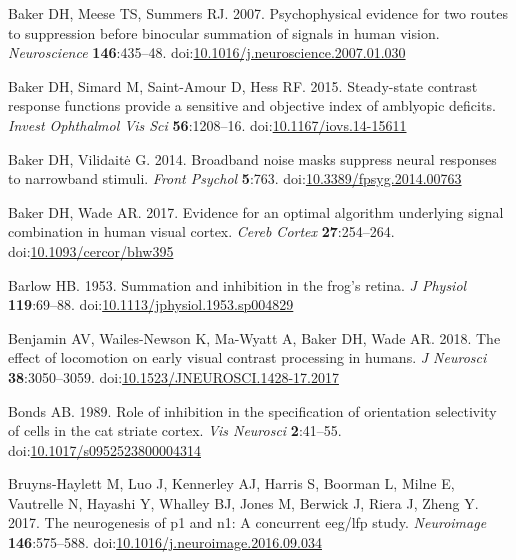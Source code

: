 \documentclass[]{article}
\begin{document}
\leavevmode\hypertarget{ref-Baker2007}{}%
Baker DH, Meese TS, Summers RJ. 2007. Psychophysical evidence for two routes to suppression before binocular summation of signals in human vision. \emph{Neuroscience} \textbf{146}:435--48. doi:\href{https://doi.org/10.1016/j.neuroscience.2007.01.030}{10.1016/j.neuroscience.2007.01.030}

\leavevmode\hypertarget{ref-Baker2015}{}%
Baker DH, Simard M, Saint-Amour D, Hess RF. 2015. Steady-state contrast response functions provide a sensitive and objective index of amblyopic deficits. \emph{Invest Ophthalmol Vis Sci} \textbf{56}:1208--16. doi:\href{https://doi.org/10.1167/iovs.14-15611}{10.1167/iovs.14-15611}

\leavevmode\hypertarget{ref-Baker2014}{}%
Baker DH, Vilidaitė G. 2014. Broadband noise masks suppress neural responses to narrowband stimuli. \emph{Front Psychol} \textbf{5}:763. doi:\href{https://doi.org/10.3389/fpsyg.2014.00763}{10.3389/fpsyg.2014.00763}

\leavevmode\hypertarget{ref-Baker2017}{}%
Baker DH, Wade AR. 2017. Evidence for an optimal algorithm underlying signal combination in human visual cortex. \emph{Cereb Cortex} \textbf{27}:254--264. doi:\href{https://doi.org/10.1093/cercor/bhw395}{10.1093/cercor/bhw395}

\leavevmode\hypertarget{ref-Barlow1953}{}%
Barlow HB. 1953. Summation and inhibition in the frog's retina. \emph{J Physiol} \textbf{119}:69--88. doi:\href{https://doi.org/10.1113/jphysiol.1953.sp004829}{10.1113/jphysiol.1953.sp004829}

\leavevmode\hypertarget{ref-Benjamin2018}{}%
Benjamin AV, Wailes-Newson K, Ma-Wyatt A, Baker DH, Wade AR. 2018. The effect of locomotion on early visual contrast processing in humans. \emph{J Neurosci} \textbf{38}:3050--3059. doi:\href{https://doi.org/10.1523/JNEUROSCI.1428-17.2017}{10.1523/JNEUROSCI.1428-17.2017}

\leavevmode\hypertarget{ref-Bonds1989}{}%
Bonds AB. 1989. Role of inhibition in the specification of orientation selectivity of cells in the cat striate cortex. \emph{Vis Neurosci} \textbf{2}:41--55. doi:\href{https://doi.org/10.1017/s0952523800004314}{10.1017/s0952523800004314}

\leavevmode\hypertarget{ref-Bruyns-Haylett2017}{}%
Bruyns-Haylett M, Luo J, Kennerley AJ, Harris S, Boorman L, Milne E, Vautrelle N, Hayashi Y, Whalley BJ, Jones M, Berwick J, Riera J, Zheng Y. 2017. The neurogenesis of p1 and n1: A concurrent eeg/lfp study. \emph{Neuroimage} \textbf{146}:575--588. doi:\href{https://doi.org/10.1016/j.neuroimage.2016.09.034}{10.1016/j.neuroimage.2016.09.034}
\end{document}
